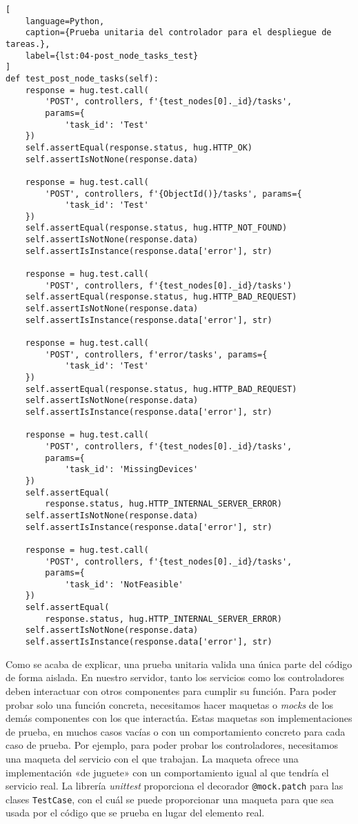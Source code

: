 \begin{lstlisting}[
    language=Python,
    caption={Prueba unitaria del controlador para el despliegue de tareas.},
    label={lst:04-post_node_tasks_test}
]
def test_post_node_tasks(self):
    response = hug.test.call(
        'POST', controllers, f'{test_nodes[0]._id}/tasks',
        params={
            'task_id': 'Test'
    })
    self.assertEqual(response.status, hug.HTTP_OK)
    self.assertIsNotNone(response.data)

    response = hug.test.call(
        'POST', controllers, f'{ObjectId()}/tasks', params={
            'task_id': 'Test'
    })
    self.assertEqual(response.status, hug.HTTP_NOT_FOUND)
    self.assertIsNotNone(response.data)
    self.assertIsInstance(response.data['error'], str)

    response = hug.test.call(
        'POST', controllers, f'{test_nodes[0]._id}/tasks')
    self.assertEqual(response.status, hug.HTTP_BAD_REQUEST)
    self.assertIsNotNone(response.data)
    self.assertIsInstance(response.data['error'], str)

    response = hug.test.call(
        'POST', controllers, f'error/tasks', params={
            'task_id': 'Test'
    })
    self.assertEqual(response.status, hug.HTTP_BAD_REQUEST)
    self.assertIsNotNone(response.data)
    self.assertIsInstance(response.data['error'], str)

    response = hug.test.call(
        'POST', controllers, f'{test_nodes[0]._id}/tasks',
        params={
            'task_id': 'MissingDevices'
    })
    self.assertEqual(
        response.status, hug.HTTP_INTERNAL_SERVER_ERROR)
    self.assertIsNotNone(response.data)
    self.assertIsInstance(response.data['error'], str)

    response = hug.test.call(
        'POST', controllers, f'{test_nodes[0]._id}/tasks',
        params={
            'task_id': 'NotFeasible'
    })
    self.assertEqual(
        response.status, hug.HTTP_INTERNAL_SERVER_ERROR)
    self.assertIsNotNone(response.data)
    self.assertIsInstance(response.data['error'], str)
\end{lstlisting}

Como se acaba de explicar, una prueba unitaria valida una única parte del código
de forma aislada. En nuestro servidor, tanto los servicios como los
controladores deben interactuar con otros componentes para cumplir su función.
Para poder probar solo una función concreta, necesitamos hacer maquetas o
\textit{mocks} de los demás componentes con los que interactúa. Estas maquetas
son implementaciones de prueba, en muchos casos vacías o con un comportamiento
concreto para cada caso de prueba. Por ejemplo, para poder probar los
controladores, necesitamos una maqueta del servicio con el que trabajan. La
maqueta ofrece una implementación «de juguete» con un comportamiento igual al
que tendría el servicio real. La librería \textit{unittest} proporciona el
decorador \texttt{@mock.patch} para las clases \texttt{TestCase}, con el cuál se
puede proporcionar una maqueta para que sea usada por el código que se prueba en
lugar del elemento real.


